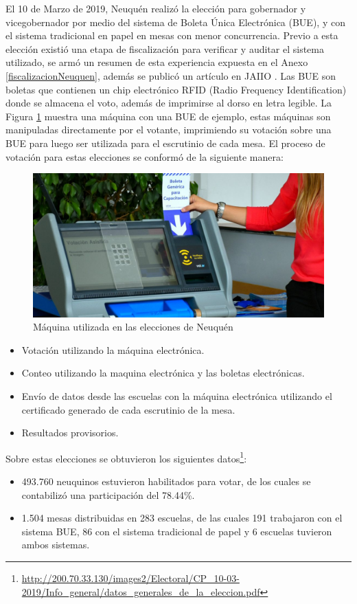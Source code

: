 El 10 de Marzo de 2019, Neuquén realizó la elección para gobernador y vicegobernador por medio del sistema de Boleta Única Electrónica (BUE), y con el sistema tradicional en papel en mesas con menor concurrencia. Previo a esta elección existió una etapa de fiscalización para verificar y auditar el sistema utilizado, se armó un resumen de esta experiencia expuesta en el Anexo \ref{fiscalizacionNeuquen}, además se publicó un artículo en JAIIO \cite{articuloGukenaFiscalizacion}. Las BUE son boletas que contienen un chip electrónico RFID (Radio Frequency Identification)\cite{rfc} donde se almacena el voto, además de imprimirse al dorso en letra legible.
La Figura \ref{fig:maquinasBUE} muestra una máquina con una BUE de ejemplo, estas máquinas son manipuladas directamente por el votante, imprimiendo su votación sobre una BUE para luego ser utilizada para el escrutinio de cada mesa. El proceso de votación para estas elecciones se conformó de la siguiente manera:
\begin{figure}
\begin{center}
  \includegraphics[scale=0.4]{img/Maquina_BUE.jpg}
  \caption{Máquina utilizada en las elecciones de Neuquén}
  \label{fig:maquinasBUE}
\end{center}
\end{figure}
\begin{itemize}
    \item Votación utilizando la máquina electrónica.
    \item Conteo utilizando la maquina electrónica y las boletas electrónicas.
    \item Envío de datos desde las escuelas con la máquina electrónica utilizando el certificado generado de cada escrutinio de la mesa.
    \item Resultados provisorios.
\end{itemize}

Sobre estas elecciones se obtuvieron los siguientes datos\footnote{\url{http://200.70.33.130/images2/Electoral/CP_10-03-2019/Info\_general/datos\_generales\_de\_la\_eleccion.pdf}}:
\begin{itemize}
    \item 493.760 neuquinos estuvieron habilitados para votar, de los cuales se contabilizó una participación del 78.44\%.
    \item 1.504 mesas distribuidas en 283 escuelas, de las cuales 191 trabajaron con el sistema BUE, 86 con el sistema tradicional de papel y 6 escuelas tuvieron ambos sistemas.
\end{itemize}

